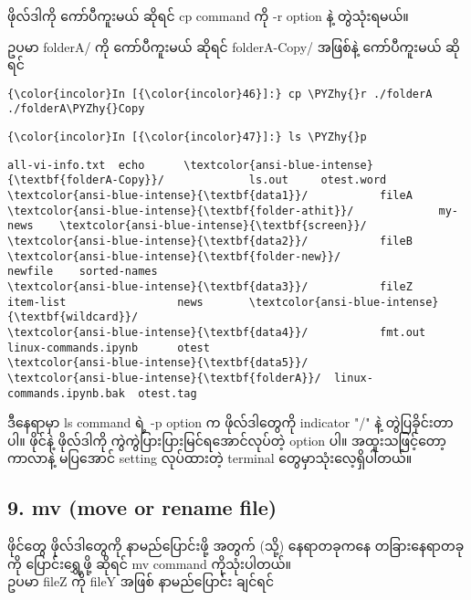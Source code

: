 \documentclass[11pt]{article}
\def\PYZhy{\char`\-}
\begin{document}
ဖိုလ်ဒါကို ကော်ပီကူးမယ် ဆိုရင် cp command ကို -r option နဲ့ တွဲသုံးရမယ်။

ဥပမာ folderA/ ကို ကော်ပီကူးမယ် ဆိုရင် folderA-Copy/ အဖြစ်နဲ့
ကော်ပီကူးမယ် ဆိုရင်

    \begin{Verbatim}[commandchars=\\\{\}]
{\color{incolor}In [{\color{incolor}46}]:} cp \PYZhy{}r ./folderA ./folderA\PYZhy{}Copy
\end{Verbatim}

    \begin{Verbatim}[commandchars=\\\{\}]
{\color{incolor}In [{\color{incolor}47}]:} ls \PYZhy{}p
\end{Verbatim}

    \begin{Verbatim}[commandchars=\\\{\}]
all-vi-info.txt  echo      \textcolor{ansi-blue-intense}{\textbf{folderA-Copy}}/             ls.out     otest.word
\textcolor{ansi-blue-intense}{\textbf{data1}}/           fileA     \textcolor{ansi-blue-intense}{\textbf{folder-athit}}/             my-news    \textcolor{ansi-blue-intense}{\textbf{screen}}/
\textcolor{ansi-blue-intense}{\textbf{data2}}/           fileB     \textcolor{ansi-blue-intense}{\textbf{folder-new}}/               newfile    sorted-names
\textcolor{ansi-blue-intense}{\textbf{data3}}/           fileZ     item-list                 news       \textcolor{ansi-blue-intense}{\textbf{wildcard}}/
\textcolor{ansi-blue-intense}{\textbf{data4}}/           fmt.out   linux-commands.ipynb      otest
\textcolor{ansi-blue-intense}{\textbf{data5}}/           \textcolor{ansi-blue-intense}{\textbf{folderA}}/  linux-commands.ipynb.bak  otest.tag

    \end{Verbatim}

    ဒီနေရာမှာ ls command ရဲ့ -p option က ဖိုလ်ဒါတွေကို indicator "/" နဲ့
တွဲပြခိုင်းတာပါ။ ဖိုင်နဲ့ ဖိုလ်ဒါကို ကွဲကွဲပြားပြားမြင်ရအောင်လုပ်တဲ့
option ပါ။ အထူးသဖြင့်တော့ ကာလာနဲ့ မပြအောင် setting လုပ်ထားတဲ့ terminal
တွေမှာသုံးလေ့ရှိပါတယ်။

    \subsection{9. mv (move or rename file)}\label{mv-move-or-rename-file}

ဖိုင်တွေ ဖိုလ်ဒါတွေကို နာမည်ပြောင်းဖို့ အတွက် (သို့) နေရာတခုကနေ
တခြားနေရာတခုကို ပြောင်းရွှေ့ဖို့ ဆိုရင် mv command ကိုသုံးပါတယ်။\\
ဥပမာ fileZ ကို fileY အဖြစ် နာမည်ပြောင်း ချင်ရင်
\end{document}
